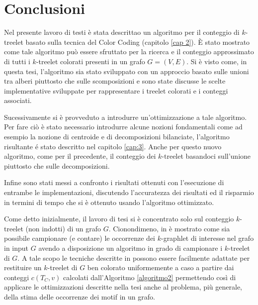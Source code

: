 \chapter{Conclusioni}
Nel presente lavoro di testi \`e stata descrittao  un algoritmo per il conteggio di $ k $-treelet basato sulla tecnica del Color Coding (capitolo \ref{cap 2}).
È stato mostrato come tale algoritmo pu\`o essere sfruttato per la ricerca e il conteggio approssimato di tutti i $ k $-treelet colorati presenti in un grafo $ G=(V,E) $.
Si \`e visto come, in questa tesi, l'algoritmo sia stato sviluppato con un approccio basato sulle unioni tra alberi piuttosto che sulle scomposizioni e sono state discusse le scelte implementative sviluppate per rappresentare i treelet colorati e i conteggi associati.

Sucessivamente si \`e provveduto a introdurre un'ottimizzazione a tale algoritmo.\\
Per fare ci\`o \`e stato necessario introdurre alcune nozioni fondamentali come ad esempio la nozione di centroide e di decomposizioni bilanciate, l'algoritmo risultante \'e stato descritto nel capitolo \ref{cap:3}.
Anche per questo nuovo algoritmo, come per il precedente, il conteggio dei $ k $-treelet basandoci sull'unione piuttosto che sulle decomposizioni.

Infine sono stati messi a confronto i risultati ottenuti con l'esecuzione di entrambe le implementazioni, discutendo l'accuratezza dei risultati ed il risparmio in termini di tempo che si \`e ottenuto usando l'algoritmo ottimizzato.

Come detto inizialmente, il lavoro di tesi si \`e concentrato solo sul conteggio $ k $-treelet (non indotti) di un grafo $ G $. Cionondimeno, in \cite{bressan2018motif,bressan2019motivo} \`e mostrato come sia possibile campionare (e contare) le occorrenze dei $ k $-graphlet di interesse nel grafo in input $ G $ avendo a disposizione un algoritmo in grado di campionare i $ k $-treelet di $ G $.
A tale scopo le tecniche descritte in \cite{bressan2018motif,bressan2019motivo} possono essere facilmente adattate per restituire un $ k $-treelet di $ G $ ben colorato uniformemente a caso a partire dai conteggi $ c(T_C,v) $ calcolati dall'Algoritmo \ref{algoritmo2} permettendo così di applicare le ottimizzazioni descritte nella tesi anche al problema, più generale, della stima delle occorrenze dei motif in un grafo.

